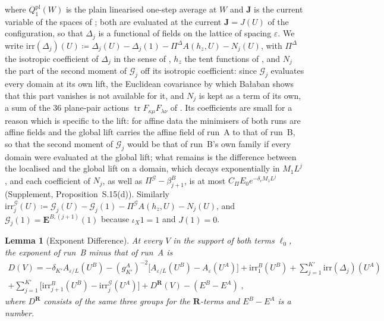 \documentclass[11pt]{preprint}
\newcommand{\tr}{\operatorname{tr}}
\numberwithin{equation}{section}
\newtheorem{lemma}[theorem]{Lemma}
\theoremstyle{definition}
\theoremstyle{remark}
\theoremstyle{plain}
\begin{document}
where $Q^{\mathrm{pl}}_1(W)$ is the plain linearised one-step average at $W$ and $\mathbf J$ is the current variable of the spaces of \cite[(1.10)--(1.16), p.~262]{BalabanRG1}; both are evaluated at the current $\mathbf J = J(U)$ of the configuration, so that $\Delta_j$ is a functional of fields on the lattice of spacing $\varepsilon$. We write $\mathrm{irr}(\Delta_j)(U) \coloneqq \Delta_j(U) - \Delta_j(1) - \Pi^\Delta A(h_z, U) - N_j(U)$, with $\Pi^\Delta$ the isotropic coefficient of $\Delta_j$ in the sense of \cite[(3.57)--(3.61), pp.~281--282]{BalabanCRE}, $h_z$ the tent functions of \cite[(3.65), p.~283]{BalabanCRE}, and $N_j$ the part of the second moment of $\mathcal G_j$ off its isotropic coefficient: since $\mathcal G_j$ evaluates every domain at its own lift, the Euclidean covariance by which Ba{\l}aban shows that this part vanishes \cite[(3.60)--(3.61), p.~282]{BalabanCRE} is not available for it, and $N_j$ is kept as a term of its own, a sum of the $36$ plane-pair actions $\tr F_{\kappa\mu}F_{\lambda\nu}$ of \cite[(3.57)]{BalabanCRE}. Its coefficients are small for a reason which is specific to the lift: for affine data the minimisers of both runs are affine fields and the global lift carries the affine field of run~A to that of run~B, so that the second moment of $\mathcal G_j$ would be that of run~B's own family if every domain were evaluated at the global lift; what remains is the difference between the localised and the global lift on a domain, which decays exponentially in $M_1L^j$, and each coefficient of $N_j$, as well as $\Pi^{\mathcal G} - \beta^B_{j+1}$, is at most $C_\Pi E_0e^{-\delta_cM_1L^j}$ (Supplement, Proposition~S.15(d)). Similarly $\mathrm{irr}^{\mathcal G}_j(U) \coloneqq \mathcal G_j(U) - \mathcal G_j(1) - \Pi^{\mathcal G}A(h_z, U) - N_j(U)$, and $\mathcal G_j(1) = \mathbf E^{B,(j+1)}(1)$ because $\iota_X1 = 1$ and $J(1) = 0$.

\begin{lemma}[Exponent Difference]\label{lem:exponent-difference}
At every $V$ in the support of both terms $\ell_0$, the exponent of run~B minus that of run~A is
\begin{multline}\label{eq:exponent-difference}
    D(V) = -\delta_{K'}A_{\varepsilon/L}(U^B) - (g^A_{K'})^{-2}\bigl[A_{\varepsilon/L}(U^B) - A_\varepsilon(U^A)\bigr] + \mathrm{irr}^B_1(U^B) + \sum_{j=1}^{K'}\mathrm{irr}(\Delta_j)(U^A)\\
    + \sum_{j=1}^{K'}\bigl[\mathrm{irr}^B_{j+1}(U^B) - \mathrm{irr}^{\mathcal G}_j(U^A)\bigr] + D^{\mathbf R}(V) - (E^B - E^A)\;,
\end{multline}
where $D^{\mathbf R}$ consists of the same three groups for the $\mathbf R$-terms and $E^B - E^A$ is a number.
\end{lemma}
\end{document}
